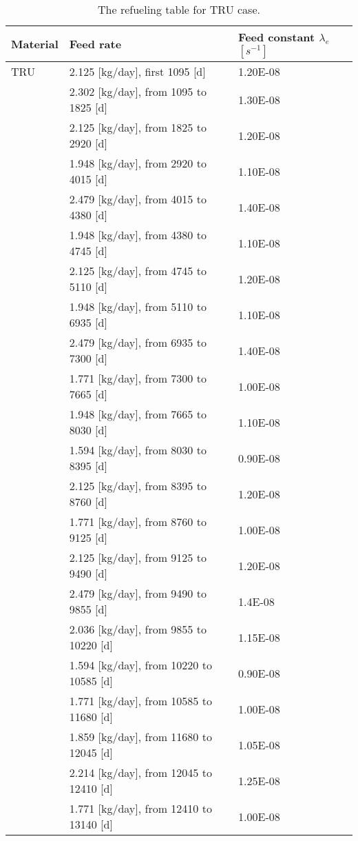 \newpage
\begin{longtable}{|p{}|p{}|p{}|}
	\caption{The refueling table for TRU case.} 
	\vspace{-0.2in}
	\label{tab:table10}
	\endfirsthead
	\endhead
	\hline
	\textbf{Material} & \textbf{Feed rate} & \textbf{Feed 
		constant} $\lambda_{e}$ $[s^{-1}]$ \\
	\hline
	TRU        &  2.125 [kg/day], first 1095 [d] & 1.20E-08 \\
	&  2.302  [kg/day], from 1095 to 1825 [d] & 		1.30E-08 \\
	&  2.125  [kg/day], from 1825 to 2920 [d] & 		1.20E-08 \\
	&  1.948 [kg/day], from 2920 to 4015 [d]& 		1.10E-08	\\
	&  2.479 [kg/day], from 4015 to 4380 [d] &		1.40E-08	\\
	&  1.948 [kg/day], from 4380 to 4745 [d] &		1.10E-08	\\
	&  2.125   [kg/day], from 4745 to 5110 [d] &	1.20E-08	\\
	&  1.948   [kg/day], from 5110 to 6935 [d]&		1.10E-08		\\
	&  2.479  [kg/day], from 6935 to 7300 [d]&		1.40E-08	 \\ 
	&  1.771   [kg/day], from 7300 to 7665 [d]&		1.00E-08	 \\ 
	&  1.948   [kg/day], from 7665 to 8030 [d]&		1.10E-08	 \\ 
	&  1.594   [kg/day], from 8030 to 8395 [d]&		0.90E-08	 \\
	&  2.125   [kg/day], from 8395 to 8760 [d]&		1.20E-08	 \\
	&  1.771  [kg/day], from 8760 to 9125 [d]&		1.00E-08	 \\
	& 2.125  [kg/day], from 9125 to 9490 [d]&		1.20E-08	 \\
	&  2.479  [kg/day], from 9490 to 9855 [d]&		1.4E-08	 \\
	&   2.036 [kg/day], from 9855 to 10220 [d]&		1.15E-08	 \\
	&  1.594 [kg/day], from 10220 to 10585 [d]&		0.90E-08	 \\
	&   1.771  [kg/day], from 10585 to 11680 [d]&		1.00E-08	 \\
	&  1.859   [kg/day], from 11680 to 12045 [d]&		1.05E-08	 \\
	& 2.214    [kg/day], from 12045 to 12410 [d]&		1.25E-08	 \\
	&  1.771   [kg/day], from 12410 to 13140 [d]&		1.00E-08	 \\

\end{longtable}
